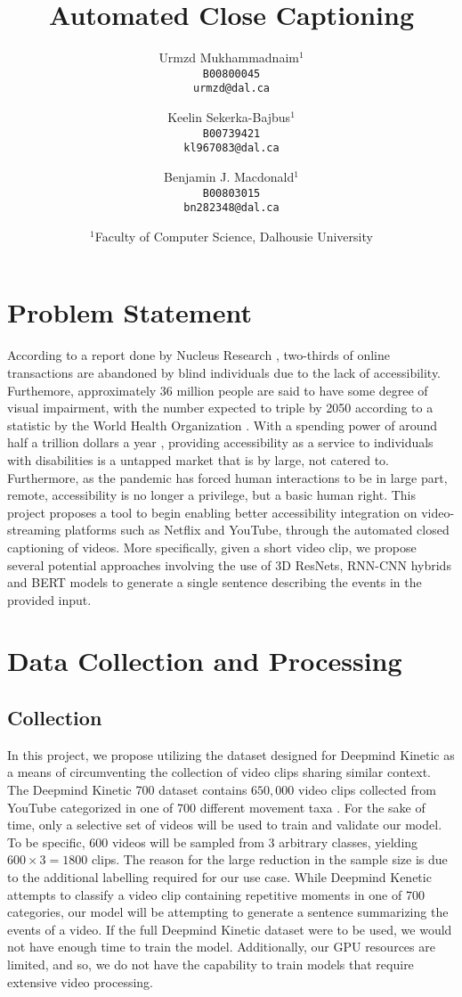 \documentclass[10pt]{article}
\title{Automated Close Captioning}
\author{
Urmzd Mukhammadnaim$^1$\\
\texttt{B00800045} \\
\texttt{urmzd@dal.ca} \\
\and
Keelin Sekerka-Bajbus$^1$\\
\texttt{B00739421}\\
\texttt{kl967083@dal.ca}
\fig
\and
Benjamin J. Macdonald$^1$\\
\texttt{B00803015}\\
\texttt{bn282348@dal.ca}
}
\date{
$^1$Faculty of Computer Science, Dalhousie University
}
\begin{document}
\maketitle

\section{Problem Statement}
According to a report done by Nucleus Research \cite{nucleus_research_2019}, two-thirds
of online transactions are abandoned by blind individuals due to the lack of accessibility.
Furthemore, approximately 36 million people are said to have some degree of visual impairment, with the number
expected to triple by 2050 according to a statistic by the World Health Organization \cite{world_health_organization_2021}.
With a spending power of around half a trillion dollars a year \cite{yin_smith_overton_shaewitz_2018}, providing accessibility
as a service to individuals with disabilities is a untapped market that is by large, not catered to.
Furthermore, as the pandemic has forced human interactions to be in large part, remote, accessibility is no longer
a privilege, but a basic human right. This project proposes a tool to begin enabling better accessibility
integration on video-streaming platforms such as Netflix and YouTube, through the automated
closed captioning of videos. More specifically, given a short video clip, we propose several potential approaches 
involving the use of 3D ResNets, RNN-CNN hybrids and BERT models to generate a single sentence describing the events in the provided input.

\section{Data Collection and Processing}

\subsection{Collection}
In this project, we propose utilizing the dataset designed for Deepmind Kinetic as a means of
circumventing the collection of video clips sharing similar context. 
The Deepmind Kinetic 700 dataset contains $650,000$ video clips collected from YouTube
categorized in one of 700 different movement taxa \cite{DBLP:journals/corr/abs-2010-10864}. 
For the sake of time, only a selective set of videos will be used to train and validate
our model. To be specific, $600$ videos will be sampled from $3$ arbitrary classes, yielding 
$600 \times 3 = 1800$ clips. The reason for the large reduction in the sample size is due to the additional labelling
required for our use case. While Deepmind Kenetic attempts to classify a video clip containing repetitive moments
in one of 700 categories, our model will be attempting to generate a sentence summarizing the events of a video.
If the full Deepmind Kinetic dataset were to be used, we would not have enough time to train the model.
Additionally, our GPU resources are limited, and so, we do not have the capability to train models
that require extensive video processing.
\end{document}
